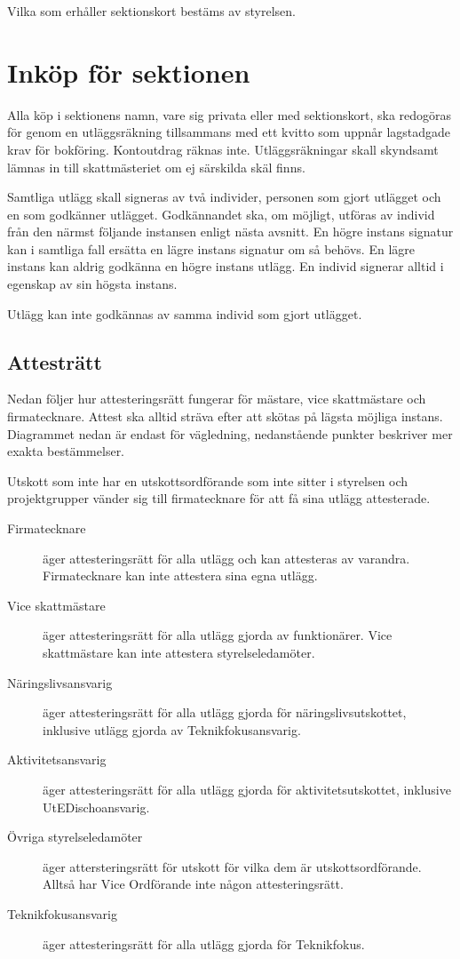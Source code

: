 \documentclass{dsekprotokoll}
\begin{document}
Vilka som erhåller sektionskort bestäms av styrelsen.

\section{Inköp för sektionen}
Alla köp i sektionens namn, vare sig privata eller med sektionskort, 
ska redogöras för genom en utläggsräkning tillsammans med ett kvitto som uppnår lagstadgade krav för bokföring. 
Kontoutdrag räknas inte. Utläggsräkningar skall skyndsamt lämnas in till
skattmästeriet om ej särskilda skäl finns.

Samtliga utlägg skall signeras av två individer, personen som gjort utlägget och
en som godkänner utlägget. Godkännandet ska, om möjligt, utföras av individ
från den närmst följande instansen enligt nästa avsnitt. En högre instans
signatur kan i samtliga fall ersätta en lägre instans signatur om så
behövs. En lägre instans kan aldrig godkänna en högre instans utlägg. En individ
signerar alltid i egenskap av sin högsta instans.

Utlägg kan inte godkännas av samma individ som gjort utlägget.

\subsection{Attesträtt}
Nedan följer hur attesteringsrätt fungerar för mästare, vice skattmästare och
firmatecknare.  Attest ska alltid sträva efter att skötas på lägsta möjliga
instans. Diagrammet nedan är endast för vägledning, nedanstående punkter
beskriver mer exakta bestämmelser.

Utskott som inte har en utskottsordförande som inte sitter i styrelsen och
projektgrupper vänder sig till firmatecknare för att få sina utlägg
attesterade.

\begin{description}
  \item[Firmatecknare] äger attesteringsrätt för alla utlägg och kan attesteras
    av varandra. Firmatecknare kan inte attestera sina egna utlägg.
  \item[Vice skattmästare] äger attesteringsrätt för alla utlägg gjorda av
    funktionärer. Vice skattmästare kan inte attestera styrelseledamöter.
  \item[Näringslivsansvarig] äger attesteringsrätt för alla utlägg gjorda för
    näringslivsutskottet, inklusive utlägg gjorda av Teknikfokusansvarig.
  \item[Aktivitetsansvarig] äger attesteringsrätt för alla utlägg gjorda för
    aktivitetsutskottet, inklusive UtEDischoansvarig.
  \item[Övriga styrelseledamöter] äger attersteringsrätt för utskott för vilka
    dem är utskottsordförande. Alltså har Vice Ordförande inte någon
    attesteringsrätt.
  \item[Teknikfokusansvarig] äger attesteringsrätt för alla utlägg gjorda för
    Teknikfokus.
\end{description}
\end{document}
